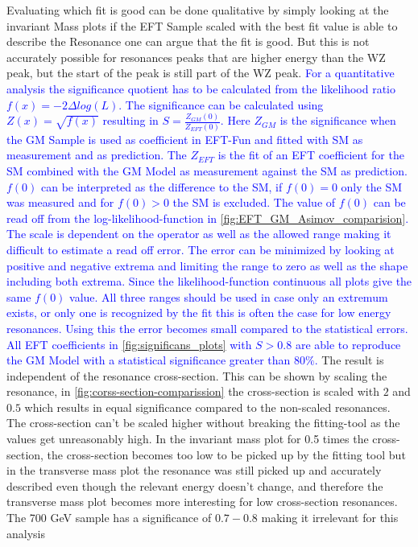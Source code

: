 \documentclass[../Bachelorarbeit.tex]{subfiles}
\begin{document}
Evaluating which fit is good can be done qualitative by simply looking at the invariant Mass plots if the EFT Sample scaled with the best fit value is able to describe
the Resonance one can argue that the fit is good. But this is not accurately possible for resonances peaks that are higher energy than the WZ peak, but the start of the peak is still part of the WZ peak.
\textcolor{blue}{For a quantitative analysis the significance quotient has to be calculated from the likelihood ratio $f(x)=-2\Delta log(L)$.
    The significance can be calculated using $Z(x)=\sqrt{f(x)}$ resulting in $S = \frac{Z_{GM}(0)}{Z_{EFT}(0)}$.
    Here $Z_{GM}$ is the significance when the GM Sample is used as coefficient in EFT-Fun and fitted with SM as measurement and as prediction.
    The $Z_{EFT}$ is the fit of an EFT coefficient for the SM combined with the GM Model as measurement against the SM as prediction.
    $f(0)$ can be interpreted as the difference to the SM, if $f(0) = 0$ only the SM was measured and for $f(0) > 0$ the SM is excluded.
    The value of $f(0)$ can be read off from the log-likelihood-function in \ref{fig:EFT_GM_Asimov_comparision}. The scale is dependent on
    the operator as well as the allowed range making it difficult to estimate a read off error. The error can be minimized by looking at positive and negative extrema and limiting the range to zero as well as the shape including both extrema.
    Since the likelihood-function continuous all plots give the same $f(0)$ value. All three ranges should be used in case only an extremum exists, or only one is recognized by the fit this is often the case for low energy resonances.
    Using this the error becomes small compared to the statistical errors. All EFT coefficients in \ref{fig:significans_plots} with $S>0.8$ are able to reproduce the GM Model with a statistical significance greater than $80\%$.}
The result is independent of the resonance cross-section. This can be shown by scaling the resonance, in \ref{fig:corss-section-comparission} the cross-section is scaled with $2$ and $0.5$ which results in equal significance compared to the non-scaled resonances.
The cross-section can't be scaled higher without breaking the fitting-tool as the values get unreasonably high. In the invariant mass plot for 0.5 times the cross-section, the cross-section becomes too low to be picked up by the fitting tool but in the transverse mass plot
the resonance was still picked up and accurately described even though the relevant energy doesn't change, and therefore the transverse mass plot becomes more interesting for low cross-section resonances. The 700 GeV sample has a significance of $0.7-0.8$ making it irrelevant for this analysis
\end{document}
